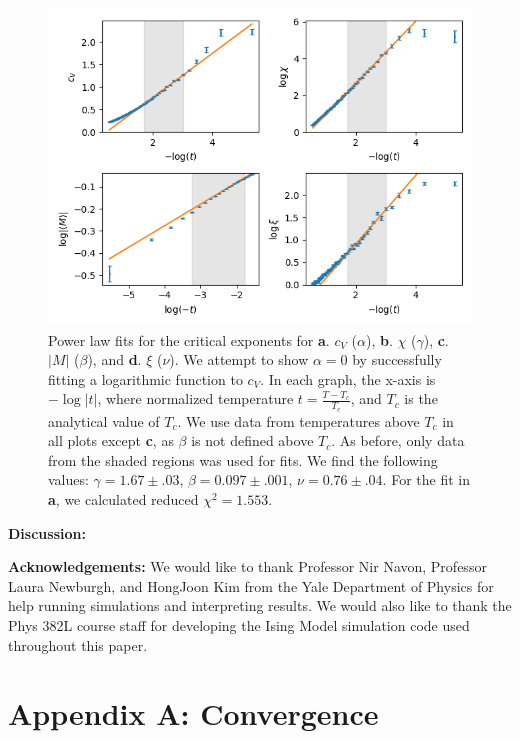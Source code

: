 \documentclass[letter,scriptaddress,twocolumn, prl,nofootinbib]{revtex4}
\begin{document}
\begin{figure}[h]
	\begin{center}
		\includegraphics[width=1\textwidth]{figs/lastfig.png}
		\caption{Power law fits for the critical exponents for \textbf{a}. $c_V$ ($\alpha$), \textbf{b}. $\chi$ ($\gamma$), \textbf{c}. $|M|$ ($\beta$), and \textbf{d}. $\xi$ ($\nu$). We attempt to show $\alpha = 0$ by successfully fitting a logarithmic function to $c_V$. In each graph, the x-axis is $-\log{|t|}$, where normalized temperature $t = \frac{T - T_c}{T_c}$, and $T_c$ is the analytical value of $T_c$. We use data from temperatures above $T_c$ in all plots except \textbf{c}, as $\beta$ is not defined above $T_c$. As before, only data from the shaded regions was used for fits. We find the following values: $\gamma = 1.67 \pm .03$, $\beta = 0.097 \pm .001$, $\nu = 0.76 \pm .04$. For the fit in \textbf{a}, we calculated reduced $\chi^2 = 1.553$.}
		\label{fig:fig5}
	\end{center}
\end{figure}

\textbf{Discussion:}

\textbf{Acknowledgements:}
	We would like to thank Professor Nir Navon, Professor Laura Newburgh, and HongJoon Kim from the Yale Department of Physics for help running simulations and interpreting results. We would also like to thank the Phys 382L course staff for developing the Ising Model simulation code used throughout this paper.
	
 


\appendix
\section{Appendix A: Convergence}
\end{document}

